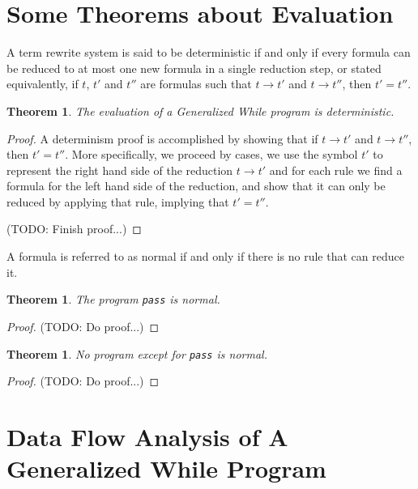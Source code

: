 \documentclass[11pt]{article}
\begin{document}
\section{Some Theorems about Evaluation}

A term rewrite system is said to be deterministic if and only if every formula can be reduced to at most one new formula in a single reduction step, or stated equivalently, if $t$, $t'$ and $t''$ are formulas such that $t \rightarrow t'$ and $t \rightarrow t''$, then $t' = t''$.

\newtheorem{determinism}{Theorem}
\begin{determinism}
The evaluation of a Generalized While program is deterministic.
\end{determinism}

\begin{proof}
A determinism proof is accomplished by showing that if $t \rightarrow t'$ and $t \rightarrow t''$, then $t' = t''$.  More specifically, we proceed by cases, we use the symbol $t'$ to represent the right hand side of the reduction $t \rightarrow t'$ and for each rule we find a formula for the left hand side of the reduction, and show that it can only be reduced by applying that rule, implying that $t' = t''$.

(TODO: Finish proof...)
\end{proof}

A formula is referred to as normal if and only if there is no rule that can reduce it.

\newtheorem{passisnormal}{Theorem}
\begin{passisnormal}
The program \texttt{pass} is normal.
\end{passisnormal}

\begin{proof}
(TODO: Do proof...)
\end{proof}

\newtheorem{passisuniquelynormal}{Theorem}
\begin{passisuniquelynormal}
No program except for \texttt{pass} is normal.
\end{passisuniquelynormal}

\begin{proof}
(TODO: Do proof...)
\end{proof}


\section{Data Flow Analysis of A Generalized While Program}
\end{document}
